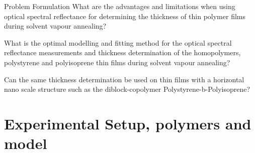 \documentclass[10pt]{beamer}
\begin{document}
\begin{frame}{Problem Formulation}
What are the advantages and limitations when using optical spectral reflectance for determining the thickness of thin polymer films during solvent vapour annealing?

What is the optimal modelling and fitting method for the optical spectral reflectance measurements and thickness determination of the homopolymers, polystyrene and polyisoprene thin films during solvent vapour annealing?  
		
Can the same thickness determination be used on thin films with a horizontal nano scale structure such as the diblock-copolymer Polystyrene-b-Polyisoprene? 
\end{frame}
	
	
	\section{Experimental Setup, polymers and model}
		
\end{document}
